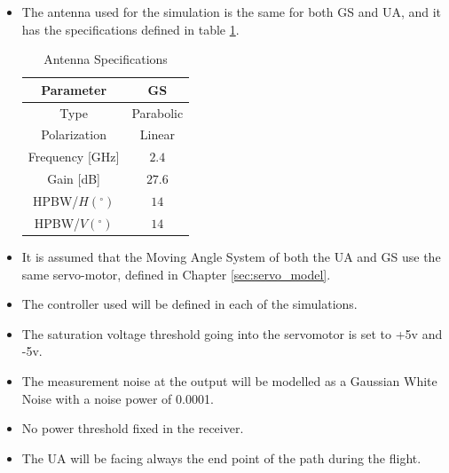 \begin{itemize}
\item{The antenna used for the simulation is the same for both GS and UA, and it has the specifications defined in table \ref{table:2}.}
\begin{table}[h]
	\centering
	\begin{tabular}{|c||c|}
		\hline
		Parameter & GS\\ \hline\hline
		Type & Parabolic\\ \hline
		Polarization & Linear\\ \hline
		Frequency [GHz] & $2.4$\\ \hline
		Gain [dB] & $27.6$\\ \hline
		HPBW/$H(^{\circ})$ & $14$\\ \hline
		HPBW/$V(^{\circ})$ & $14$\\ \hline
	\end{tabular}
	\caption{Antenna Specifications}
	\label{table:2}
\end{table}
\item{It is assumed that the Moving Angle System of both the UA and GS use the same servo-motor, defined in Chapter \ref{sec:servo_model}.}
\item{The controller used will be defined in each of the simulations.}
\item{The saturation voltage threshold going into the servomotor is set to +5v and -5v.}
\item{The measurement noise at the output will be modelled as a Gaussian White Noise with a noise power of 0.0001.}
\item{No power threshold fixed in the receiver.}
\item{The UA will be facing always the end point of the path during the flight.}
\end{itemize}


